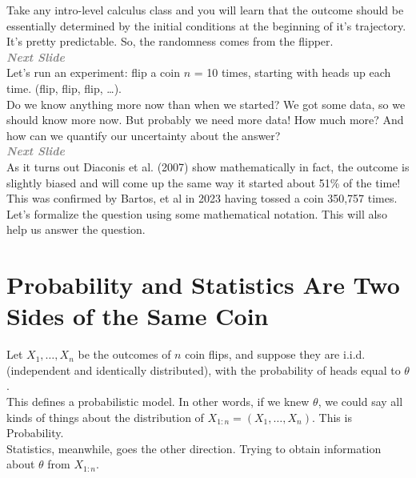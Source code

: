 \documentclass[14pt]{extarticle}
\newcommand{\mynotes}[2][Gray]{\textcolor{#1}{\textbf{\textit{#2}}}}
\newcommand{\question}[1]{\textit{\textbf{QUESTION~}#1}}
\begin{document}
Take any intro-level calculus class and you will learn that the outcome should be essentially determined by the initial conditions at the beginning of it’s trajectory. It's pretty predictable. So, the randomness comes from the flipper. \\

\mynotes{Next Slide} \\

Let's run an experiment: flip a coin $n$ = 10 times, starting with heads up each time. (flip, flip, flip, \ldots ). \\



Do we know anything more now than when we started? We got some data, so we should know more now. But probably we need more data! How much more? And how can we quantify our uncertainty about the answer? \\

\mynotes{Next Slide} \\

As it turns out Diaconis et al. (2007) show mathematically in fact, the outcome is slightly biased and will come up the same way it started about 51\% of the time! \\

This was confirmed by Bartos, et al in 2023 having tossed a coin 350,757 times. \\

Let's formalize the question using some mathematical notation. This will also help us answer the question.


\section{Probability and Statistics Are Two Sides of the Same Coin}

Let $X_1, \ldots, X_n$ be the outcomes of $n$ coin flips, and suppose they are i.i.d. (independent and identically distributed), with the probability of heads equal to $\theta$. \\

This defines a probabilistic model. In other words, if we knew $\theta$, we could say all kinds of things about the distribution of $X_{1:n} = (X_1, \ldots , X_n)$. This is Probability. \\

Statistics, meanwhile, goes the other direction. Trying to obtain information about $\theta$ from $X_{1:n}$. \\
\end{document}
